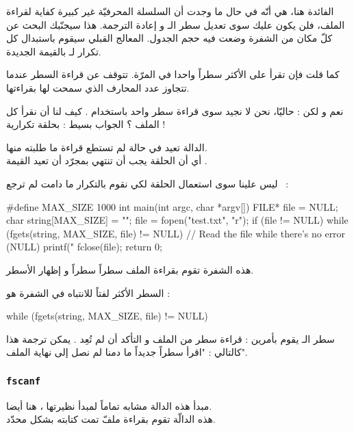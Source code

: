 الفائدة هنا، هي أنّه في حال ما وجدت أن السلسلة المحرفيّة غير كبيرة كفاية لقراءة الملف، فلن يكون عليك سوى تعديل سطر الـ
و إعادة الترجمة. هذا سيجنّبك البحث عن كلّ مكان من الشفرة وضعت فيه حجم الجدول. المعالج القبلي سيقوم باستبدال كل تكرار لـ
بالقيمة الجديدة.

كما قلت فإن
تقرأ على الأكثر سطراً واحدا في المرّة. تتوقف عن قراءة السطر عندما تتجاوز عدد المحارف الذي سمحت لها بقراءتها.

نعم و لكن : حاليّا، نحن لا نجيد سوى قراءة سطر واحد باستخدام
.
كيف لنا أن نقرأ كل الملف ؟ الجواب بسيط : بحلقة تكرارية !

الدالة
تعيد
في حالة لم تستطع قراءة ما طلبته منها.\\
أي أن الحلقة يجب أن تنتهي بمجرّد أن تعيد
القيمة
.

ليس علينا سوى استعمال الحلقة
لكي نقوم بالتكرار ما دامت
لم ترجع
~:

\begin{Csource}
#define MAX_SIZE 1000
int main(int argc, char *argv[])
{
    FILE* file = NULL;
    char string[MAX_SIZE] = "";
    file = fopen("test.txt", "r");
    if (file != NULL)
    {
        while (fgets(string, MAX_SIZE, file) != NULL) // Read the file while there's no error (NULL)
        {
            printf("%
        }
        fclose(file);
    }
    return 0;
}
\end{Csource}

هذه الشفرة تقوم بقراءة الملف سطراً سطراً و إظهار الأسطر.

السطر الأكثر لفتاً للانتباه في الشفرة هو :

\begin{Csource}
while (fgets(string, MAX_SIZE, file) != NULL)
\end{Csource}

سطر الـ
يقوم بأمرين : قراءة سطر من الملف و التأكد أن
لم تُعِد
.
يمكن ترجمة هذا كالتالي : "اقرأ سطراً جديداً ما دمنا لم نصل إلى نهاية الملف".

\subsubsection{\texttt{fscanf}}

مبدأ هذه الدالة مشابه تماماً لمبدأ نظيرتها
،
هنا أيضا.\\
هذه الدالّة تقوم بقراءة ملفّ تمت كتابته بشكل محدّد.

